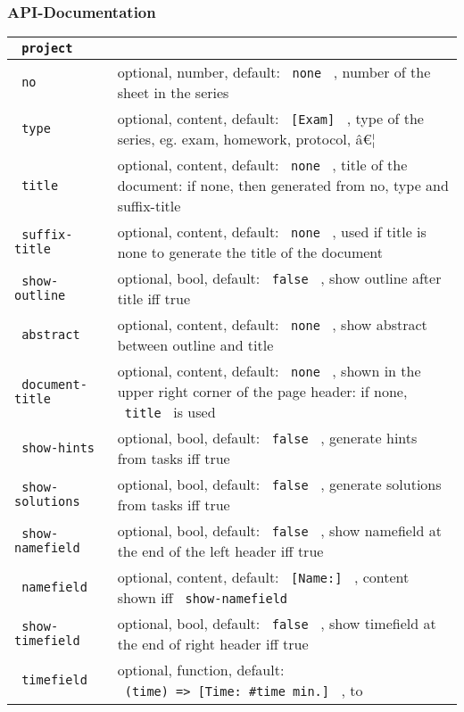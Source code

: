 \subsubsection{API-Documentation}\label{api-documentation}

\begin{longtable}[]{@{}ll@{}}
\toprule\noalign{}
\texttt{\ project\ } & \\
\midrule\noalign{}
\endhead
\bottomrule\noalign{}
\endlastfoot
\texttt{\ no\ } & optional, number, default: \texttt{\ none\ } , number
of the sheet in the series \\
\texttt{\ type\ } & optional, content, default: \texttt{\ {[}Exam{]}\ }
, type of the series, eg. exam, homework, protocol, â€¦ \\
\texttt{\ title\ } & optional, content, default: \texttt{\ none\ } ,
title of the document: if none, then generated from no, type and
suffix-title \\
\texttt{\ suffix-title\ } & optional, content, default:
\texttt{\ none\ } , used if title is none to generate the title of the
document \\
\texttt{\ show-outline\ } & optional, bool, default: \texttt{\ false\ }
, show outline after title iff true \\
\texttt{\ abstract\ } & optional, content, default: \texttt{\ none\ } ,
show abstract between outline and title \\
\texttt{\ document-title\ } & optional, content, default:
\texttt{\ none\ } , shown in the upper right corner of the page header:
if none, \texttt{\ title\ } is used \\
\texttt{\ show-hints\ } & optional, bool, default: \texttt{\ false\ } ,
generate hints from tasks iff true \\
\texttt{\ show-solutions\ } & optional, bool, default:
\texttt{\ false\ } , generate solutions from tasks iff true \\
\texttt{\ show-namefield\ } & optional, bool, default:
\texttt{\ false\ } , show namefield at the end of the left header iff
true \\
\texttt{\ namefield\ } & optional, content, default:
\texttt{\ {[}Name:{]}\ } , content shown iff
\texttt{\ show-namefield\ } \\
\texttt{\ show-timefield\ } & optional, bool, default:
\texttt{\ false\ } , show timefield at the end of right header iff
true \\
\texttt{\ timefield\ } & optional, function, default:
\texttt{\ (time)\ =\textgreater{}\ {[}Time:\ \#time\ min.{]}\ } , to

\end{longtable}
